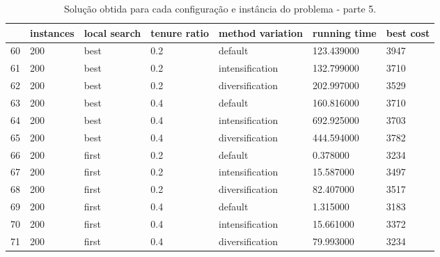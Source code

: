 \begin{landscape}
\begin{table}
\centering
\begin{tabular}{lllllll}
\toprule
{} & instances & local search & tenure ratio & method variation & running time & best cost \\
\midrule
60 &       200 &         best &          0.2 &          default &   123.439000 &      3947 \\
61 &       200 &         best &          0.2 &  intensification &   132.799000 &      3710 \\
62 &       200 &         best &          0.2 &  diversification &   202.997000 &      3529 \\
63 &       200 &         best &          0.4 &          default &   160.816000 &      3710 \\
64 &       200 &         best &          0.4 &  intensification &   692.925000 &      3703 \\
65 &       200 &         best &          0.4 &  diversification &   444.594000 &      3782 \\
66 &       200 &        first &          0.2 &          default &     0.378000 &      3234 \\
67 &       200 &        first &          0.2 &  intensification &    15.587000 &      3497 \\
68 &       200 &        first &          0.2 &  diversification &    82.407000 &      3517 \\
69 &       200 &        first &          0.4 &          default &     1.315000 &      3183 \\
70 &       200 &        first &          0.4 &  intensification &    15.661000 &      3372 \\
71 &       200 &        first &          0.4 &  diversification &    79.993000 &      3234 \\
\bottomrule
\end{tabular}
\caption{Solução obtida para cada configuração e instância do problema - parte 5.}
\label{table:all-data-5}
\end{table}


\end{landscape}
